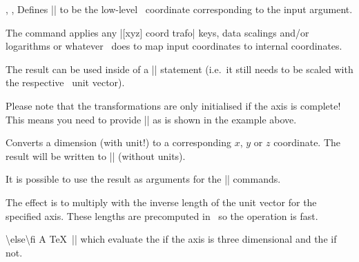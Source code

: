 \begin{commandlist}{%
	\pgfplotstransformcoordinatex{},%
	\pgfplotstransformcoordinatey{},%
	\pgfplotstransformcoordinatey{}}
	Defines |\pgfmathresult| to be the low-level \PGF\ coordinate corresponding to the input argument.

	The command applies any |[xyz] coord trafo| keys, data scalings and/or logarithms or whatever \PGFPlots\ does to map input coordinates to internal coordinates.

	The result can be used inside of a |\pgfpointxy| statement (i.e.\ it still needs to be scaled with the respective \PGF\ unit vector).
\begin{codeexample}[]
\end{codeexample}
	Please note that the transformations are only initialised if the axis is complete! This means you need to provide |\pgfplotsextra| as is shown in the example above.
\end{commandlist}

\begin{command}{\pgfplotsconvertunittocoordinate{}}
	Converts a dimension (with unit!) to a corresponding $x$, $y$ or $z$ coordinate. The result will be written to |\pgfmathresult| (without units).

	It is possible to use the result as arguments for the |\pgfpointxyz| commands.

	The effect is to multiply  with the inverse length of the unit vector for the specified axis. These lengths are precomputed in \PGFPlots\ so the operation is fast.
\begin{codeexample}
\end{codeexample}
\end{command}

\begin{command}{\ifpgfplotsthreedim{}\textbackslash else\textbackslash fi}%
	A \TeX\ |\if| which evaluate the  if the axis is three dimensional and the  if not.
\end{command}
